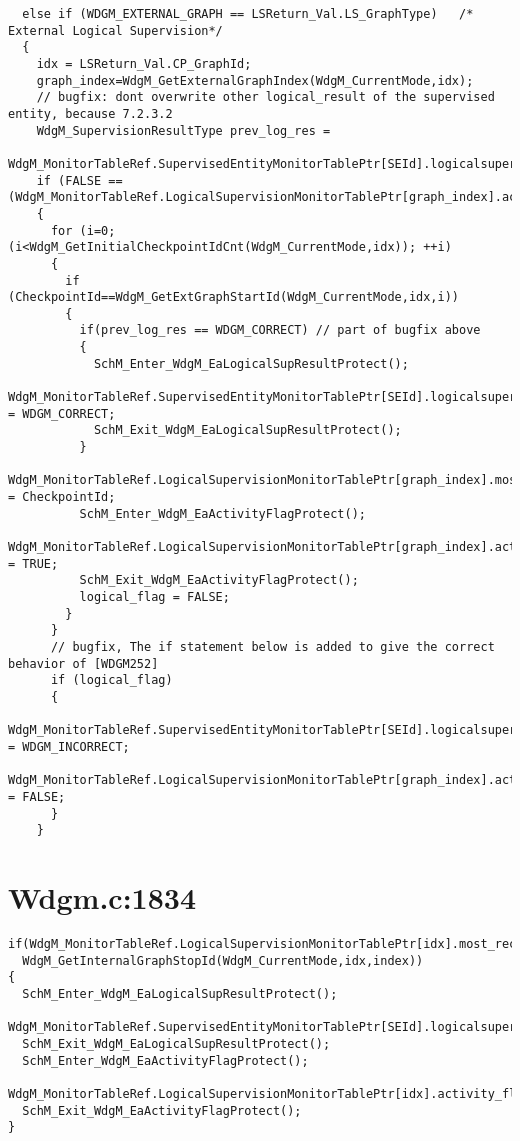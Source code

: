 \documentclass[11pt,a4paper]{article}
\begin{document}
\begin{lstlisting}
  else if (WDGM_EXTERNAL_GRAPH == LSReturn_Val.LS_GraphType)   /* External Logical Supervision*/
  {
    idx = LSReturn_Val.CP_GraphId;
    graph_index=WdgM_GetExternalGraphIndex(WdgM_CurrentMode,idx);
    // bugfix: dont overwrite other logical_result of the supervised entity, because 7.2.3.2
    WdgM_SupervisionResultType prev_log_res =
    WdgM_MonitorTableRef.SupervisedEntityMonitorTablePtr[SEId].logicalsupervision_result;
    if (FALSE == (WdgM_MonitorTableRef.LogicalSupervisionMonitorTablePtr[graph_index].activity_flag))
    {
      for (i=0; (i<WdgM_GetInitialCheckpointIdCnt(WdgM_CurrentMode,idx)); ++i)
      {
        if (CheckpointId==WdgM_GetExtGraphStartId(WdgM_CurrentMode,idx,i))
        {
          if(prev_log_res == WDGM_CORRECT) // part of bugfix above
          {
            SchM_Enter_WdgM_EaLogicalSupResultProtect();
            WdgM_MonitorTableRef.SupervisedEntityMonitorTablePtr[SEId].logicalsupervision_result = WDGM_CORRECT;
            SchM_Exit_WdgM_EaLogicalSupResultProtect();
          }
          WdgM_MonitorTableRef.LogicalSupervisionMonitorTablePtr[graph_index].most_recently_reported = CheckpointId;
          SchM_Enter_WdgM_EaActivityFlagProtect();
          WdgM_MonitorTableRef.LogicalSupervisionMonitorTablePtr[graph_index].activity_flag = TRUE;
          SchM_Exit_WdgM_EaActivityFlagProtect();
          logical_flag = FALSE;
        }
      }
      // bugfix, The if statement below is added to give the correct behavior of [WDGM252]
      if (logical_flag)
      {
        WdgM_MonitorTableRef.SupervisedEntityMonitorTablePtr[SEId].logicalsupervision_result = WDGM_INCORRECT;
        WdgM_MonitorTableRef.LogicalSupervisionMonitorTablePtr[graph_index].activity_flag = FALSE;
      }
    }
\end{lstlisting}

\newpage
\section{Wdgm.c:1834}

\begin{lstlisting}
if(WdgM_MonitorTableRef.LogicalSupervisionMonitorTablePtr[idx].most_recently_reported==
  WdgM_GetInternalGraphStopId(WdgM_CurrentMode,idx,index))
{
  SchM_Enter_WdgM_EaLogicalSupResultProtect();
  WdgM_MonitorTableRef.SupervisedEntityMonitorTablePtr[SEId].logicalsupervision_result=WDGM_CORRECT;
  SchM_Exit_WdgM_EaLogicalSupResultProtect();
  SchM_Enter_WdgM_EaActivityFlagProtect();
  WdgM_MonitorTableRef.LogicalSupervisionMonitorTablePtr[idx].activity_flag=FALSE;
  SchM_Exit_WdgM_EaActivityFlagProtect();
}
\end{lstlisting}
\end{document}
